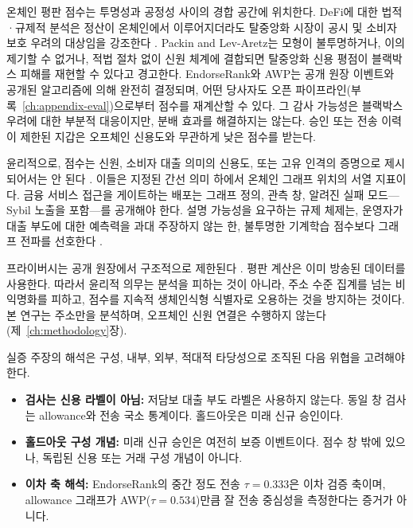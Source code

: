 온체인 평판 점수는 투명성과 공정성 사이의 경합 공간에 위치한다. DeFi에 대한 법적·규제적 분석은 정산이 온체인에서 이루어지더라도 탈중앙화 시장이 공시 및 소비자 보호 우려의 대상임을 강조한다 . Packin and Lev-Aretz는 모형이 불투명하거나, 이의 제기할 수 없거나, 적법 절차 없이 신원 체계에 결합되면 탈중앙화 신용 평점이 블랙박스 피해를 재현할 수 있다고 경고한다. EndorseRank와 AWP는 공개 원장 이벤트와 공개된 알고리즘에 의해 완전히 결정되며, 어떤 당사자도 오픈 파이프라인(부록~\ref{ch:appendix-eval})으로부터 점수를 재계산할 수 있다. 그 감사 가능성은 블랙박스 우려에 대한 부분적 대응이지만, 분배 효과를 해결하지는 않는다. 승인 또는 전송 이력이 제한된 지갑은 오프체인 신용도와 무관하게 낮은 점수를 받는다.

윤리적으로, 점수는 신원, 소비자 대출 의미의 신용도, 또는 고유 인격의 증명으로 제시되어서는 안 된다 . 이들은 지정된 간선 의미 하에서 온체인 그래프 위치의 서열 지표이다. 금융 서비스 접근을 게이트하는 배포는 그래프 정의, 관측 창, 알려진 실패 모드---Sybil 노출을 포함---를 공개해야 한다. 설명 가능성을 요구하는 규제 체제는, 운영자가 대출 부도에 대한 예측력을 과대 주장하지 않는 한, 불투명한 기계학습 점수보다 그래프 전파를 선호한다 .

프라이버시는 공개 원장에서 구조적으로 제한된다 . 평판 계산은 이미 방송된 데이터를 사용한다. 따라서 윤리적 의무는 분석을 피하는 것이 아니라, 주소 수준 집계를 넘는 비익명화를 피하고, 점수를 지속적 생체인식형 식별자로 오용하는 것을 방지하는 것이다. 본 연구는 주소만을 분석하며, 오프체인 신원 연결은 수행하지 않는다(제~\ref{ch:methodology}장).


실증 주장의 해석은 구성, 내부, 외부, 적대적 타당성으로 조직된 다음 위협을 고려해야 한다.


\begin{itemize}
\item \textbf{검사는 신용 라벨이 아님:} 저담보 대출 부도 라벨은 사용하지 않는다. 동일 창 검사는 allowance와 전송 국소 통계이다. 홀드아웃은 미래 신규 승인이다.

\item \textbf{홀드아웃 구성 개념:} 미래 신규 승인은 여전히 보증 이벤트이다. 점수 창 밖에 있으나, 독립된 신용 또는 거래 구성 개념이 아니다.

\item \textbf{이차 축 해석:} EndorseRank의 중간 정도 전송 $\tau=0.333$은 이차 검증 축이며, allowance 그래프가 AWP($\tau=0.534$)만큼 잘 전송 중심성을 측정한다는 증거가 아니다.
\end{itemize}

